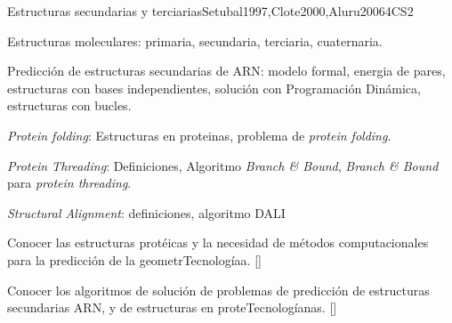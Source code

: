 \begin{syllabus}
\begin{unit}{Estructuras secundarias y terciarias}{}{Setubal1997,Clote2000,Aluru2006}{4}{CS2}
   \begin{topics}
        \item Estructuras moleculares: primaria, secundaria, terciaria, cuaternaria.
        \item Predicción de estructuras secundarias de ARN: modelo formal, energia de pares, estructuras con bases independientes, solución con Programación Dinámica, estructuras con bucles.
        \item \textit{Protein folding}: Estructuras en proteinas, problema de \textit{protein folding}.
        \item \textit{Protein Threading}: Definiciones, Algoritmo \textit{Branch \& Bound}, \textit{Branch \& Bound} para \textit{protein threading}.
        \item \textit{Structural Alignment}: definiciones, algoritmo DALI
   \end{topics}
   \begin{learningoutcomes}
        \item Conocer las estructuras protéicas y la necesidad de métodos computacionales para la predicción de la geometrTecnologíaa. [\Familiarity]
        \item Conocer los algoritmos de solución de problemas de predicción de estructuras secundarias ARN, y de estructuras en proteTecnologíanas. [\Assessment]
   \end{learningoutcomes}
\end{unit}


\end{syllabus}
